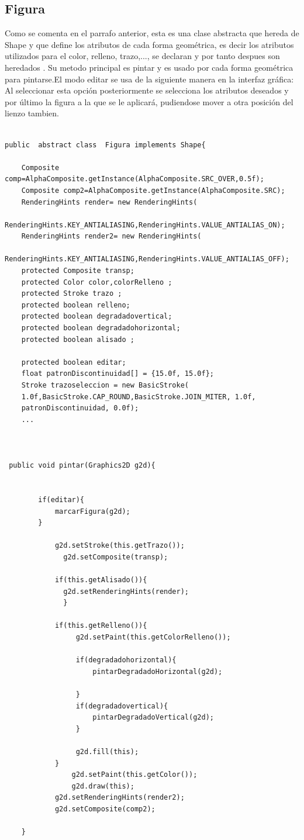 \subsection{Figura}
Como se comenta en el parrafo anterior, esta es una clase abstracta que hereda de Shape\cite{Shape} y que define los atributos de cada forma geométrica, es decir los atributos utilizados para el color, relleno, trazo,..., se declaran y por tanto despues son heredados . Su metodo principal es pintar y es usado por cada forma geométrica para pintarse.El modo editar se usa de la siguiente manera en la interfaz gráfica:
 Al seleccionar esta opción posteriormente se selecciona los atributos deseados y por último la figura a la que se le aplicará, pudiendose mover a otra posición del lienzo tambien.
\begin{lstlisting}

public  abstract class  Figura implements Shape{
   
    Composite comp=AlphaComposite.getInstance(AlphaComposite.SRC_OVER,0.5f);
    Composite comp2=AlphaComposite.getInstance(AlphaComposite.SRC);
    RenderingHints render= new RenderingHints(
    RenderingHints.KEY_ANTIALIASING,RenderingHints.VALUE_ANTIALIAS_ON);
    RenderingHints render2= new RenderingHints(
    RenderingHints.KEY_ANTIALIASING,RenderingHints.VALUE_ANTIALIAS_OFF);
    protected Composite transp;
    protected Color color,colorRelleno ;
    protected Stroke trazo ;
    protected boolean relleno;
    protected boolean degradadovertical;
    protected boolean degradadohorizontal;
    protected boolean alisado ;

    protected boolean editar;
    float patronDiscontinuidad[] = {15.0f, 15.0f};
    Stroke trazoseleccion = new BasicStroke(
    1.0f,BasicStroke.CAP_ROUND,BasicStroke.JOIN_MITER, 1.0f,
    patronDiscontinuidad, 0.0f);
    ...
    


 public void pintar(Graphics2D g2d){
        
        
        if(editar){
            marcarFigura(g2d);            
        }

            g2d.setStroke(this.getTrazo());
              g2d.setComposite(transp);

            if(this.getAlisado()){
              g2d.setRenderingHints(render);
              }
           
            if(this.getRelleno()){
                 g2d.setPaint(this.getColorRelleno());
                 
                 if(degradadohorizontal){
                     pintarDegradadoHorizontal(g2d); 
                     
                 }
                 if(degradadovertical){
                     pintarDegradadoVertical(g2d);                    
                 }
                 
                 g2d.fill(this);
            }
                g2d.setPaint(this.getColor());
                g2d.draw(this);
            g2d.setRenderingHints(render2); 
            g2d.setComposite(comp2);
        
    }
\end{lstlisting}
